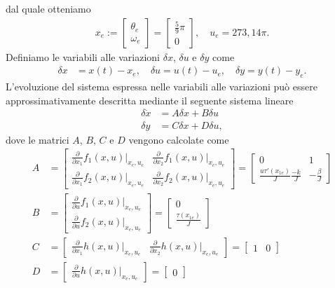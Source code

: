 \documentclass[a4paper, 11pt]{article}
\begin{document}
	dal quale otteniamo
	\begin{align}
		x_e := \begin{bmatrix}
			\theta_e \\
			\omega_e
		\end{bmatrix} = \begin{bmatrix}
			\frac{5}{9}\pi \\
			0
		\end{bmatrix},  \quad u_e = 273,14 \pi.\label{eq:equilibirum_pair}
	\end{align}
	Definiamo le variabili alle variazioni $\delta x$, $\delta u$ e $\delta y$ come 
	\begin{align*}
		\delta x &= x(t) - x_e, 
		\quad
		\delta u = u(t) - u_e, 
		\quad
		\delta y = y(t) - y_e.
	\end{align*}
	L'evoluzione del sistema espressa nelle variabili alle variazioni pu\`o essere approssimativamente descritta mediante il seguente sistema lineare
	\begin{subequations}\label{eq:linearized_system}
		\begin{align}
			\delta \dot{x} &= A\delta x + B\delta u
			\\
			\delta y &= C\delta x + D\delta u,
		\end{align}
	\end{subequations}
	dove le matrici $A$, $B$, $C$ e $D$ vengono calcolate come
	\newcommand{\pdv}[2]{\frac{\partial}{\partial #1}#2(x,u)|_{x_e,u_e}}
	\begin{subequations}\label{eq:matrices}
		\begin{align}
			A &=\begin{bmatrix}
				\pdv{x_1}{f_1} & \pdv{x_2}{f_1} \\
				\pdv{x_1}{f_2} & \pdv{x_2}{f_2}
			\end{bmatrix} = \begin{bmatrix}
				0 & 1 \\
				\frac{u\tau'(x_{1e})}{J} \frac{-k}{J} & - \frac{\beta}{J}
			\end{bmatrix}
			\\
			B &=\begin{bmatrix}
				\pdv{u}{f_1} \\
				\pdv{u}{f_2}
			\end{bmatrix} = \begin{bmatrix}
				0 \\
				\frac{\tau(x_{1e})}{J}
			\end{bmatrix}
			\\
			C &=\begin{bmatrix}
				\pdv{x_1}{h} & \pdv{x_2}{h}
			\end{bmatrix} = \begin{bmatrix}
				1 & 0
			\end{bmatrix}
			\\
			D &= \begin{bmatrix}
				\pdv{u}{h}
			\end{bmatrix} = \begin{bmatrix}
				0
			\end{bmatrix}
		\end{align}
	\end{subequations}
\end{document}
